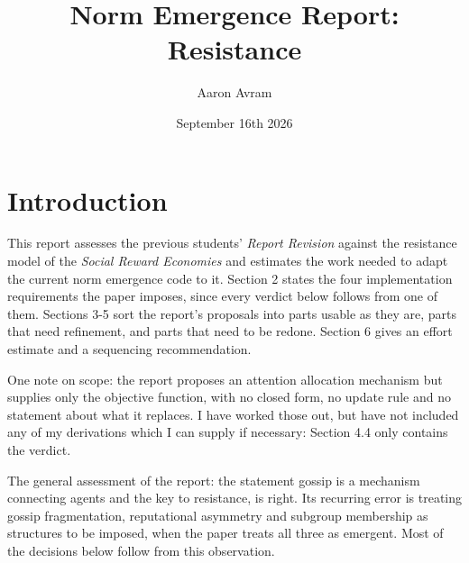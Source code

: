 \documentclass[12pt]{article}
\title{Norm Emergence Report: Resistance}
\author{Aaron Avram}
\date{September 16th 2026}
\begin{document}
\theoremstyle{plain}
\newtheorem{theorem}{Theorem}
\newtheorem{proposition}{Proposition}
\newtheorem{lemma}[theorem]{Lemma}
\newtheorem{corollary}[theorem]{Corollary}
\newtheorem{claim}[theorem]{Claim}

\theoremstyle{definition}
\newtheorem{definition}{Definition}
\newtheorem{example}{Example}
\newtheorem{exercise}[theorem]{Exercise}

\theoremstyle{remark}
\newtheorem{remark}[theorem]{Remark}
\newtheorem{note}[theorem]{Note}

\maketitle

\section{Introduction}
This report assesses the previous students' \textit{Report Revision} against the resistance
model of the \textit{Social Reward Economies} and estimates the work needed to adapt the
current norm emergence code to it. Section 2 states the four implementation requirements
the paper imposes, since every verdict below follows from one of them. Sections 3-5 sort the report's
proposals into parts usable as they are, parts that need refinement, and parts that need to be redone.
Section 6 gives an effort estimate and a sequencing recommendation.

One note on scope: the report proposes an attention allocation mechanism but supplies
only the objective function, with no closed form, no update rule and no statement about what it replaces.
I have worked those out, but have not included any of my derivations which I can supply if necessary: Section 4.4 only contains the verdict.

The general assessment of the report: the statement gossip is a mechanism connecting agents and the key to resistance,
is right. Its recurring error is treating gossip fragmentation, reputational asymmetry and subgroup membership
as structures to be imposed, when the paper treats all three as emergent. Most of the decisions below follow from this observation.
\end{document}
